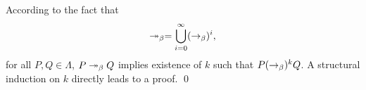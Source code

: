 \begin{pf} \rm
According to the fact that $$
 \twoheadrightarrow_{\beta} =
 \bigcup_{i=0}^{\infty} (\rightarrow_{\beta})^i,
$$ for all $P, Q\in\Lambda$,  $P\twoheadrightarrow_{\beta} Q$ implies
 existence of $k$ such that $P (\rightarrow_{\beta})^k Q$.
A structural induction on $k$ directly leads to a proof. \qed
\end{pf}

